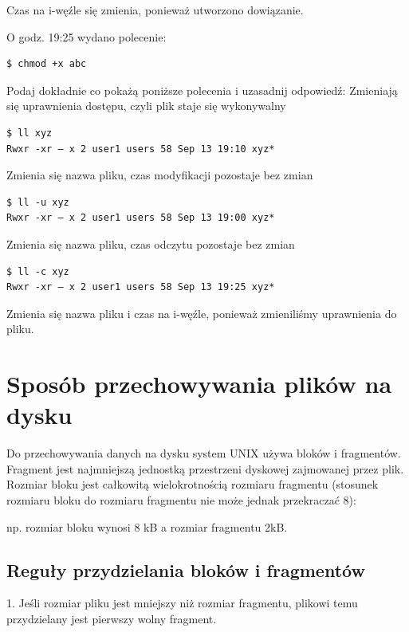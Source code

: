 \documentclass[11pt]{article}
\begin{document}
Czas na i-węźle się zmienia, ponieważ utworzono dowiązanie.


O godz. 19:25 wydano polecenie:


\begin{verbatim}
$ chmod +x abc
\end{verbatim}



Podaj dokładnie co pokażą poniższe polecenia i uzasadnij odpowiedź:
Zmieniają się uprawnienia dostępu, czyli plik staje się wykonywalny


\begin{verbatim}
$ ll xyz
Rwxr -xr – x 2 user1 users 58 Sep 13 19:10 xyz*
\end{verbatim}


Zmienia się nazwa pliku, czas modyfikacji pozostaje bez zmian

\begin{verbatim}
$ ll -u xyz
Rwxr -xr – x 2 user1 users 58 Sep 13 19:00 xyz*
\end{verbatim}


Zmienia się nazwa pliku, czas odczytu pozostaje bez zmian


\begin{verbatim}
$ ll -c xyz
Rwxr -xr – x 2 user1 users 58 Sep 13 19:25 xyz*
\end{verbatim}


Zmienia się nazwa pliku i czas na i-węźle, ponieważ zmieniliśmy uprawnienia do pliku.

\section{Sposób przechowywania plików na dysku}

Do przechowywania danych na dysku system UNIX używa bloków i fragmentów.
Fragment jest najmniejszą jednostką przestrzeni dyskowej zajmowanej przez plik.
Rozmiar bloku jest całkowitą wielokrotnością rozmiaru fragmentu (stosunek rozmiaru
bloku do rozmiaru fragmentu nie może jednak przekraczać 8):

np. rozmiar bloku wynosi 8 kB a rozmiar fragmentu 2kB.

\subsection{Reguły przydzielania bloków i fragmentów}

1. Jeśli rozmiar pliku jest mniejszy niż rozmiar fragmentu, plikowi temu przydzielany jest
pierwszy wolny fragment.
\end{document}
